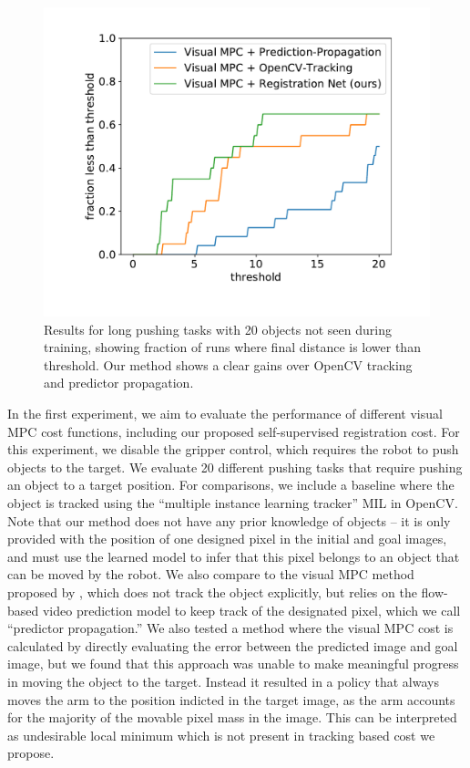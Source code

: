 \begin{figure}
	\centering
	\includegraphics[width=0.6\columnwidth]{images_rfr/pushlong_bench_same_range.pdf}
	\caption{\small{Results for long pushing tasks with 20 objects not seen during training, showing fraction of runs where final distance is lower than threshold. Our method shows a clear gains over OpenCV tracking and predictor propagation.}}
	\label{fig:push_bench_long}
\end{figure}

In the first experiment, we aim to evaluate the performance of different visual MPC cost functions, including our proposed self-supervised registration cost. For this experiment, we disable the gripper control, which requires the robot to push objects to the target. We evaluate 20 different pushing tasks that require pushing an object to a target position. For comparisons, we include a baseline where the object is tracked using the ``multiple instance learning tracker'' MIL \cite{babenko2009visual} in OpenCV. Note that our method does not have any prior knowledge of objects -- it is only provided with the position of one designed pixel in the initial and goal images, and must use the learned model to infer that this pixel belongs to an object that can be moved by the robot. We also compare to the visual MPC method proposed by \cite{sna},
which does not track the object explicitly, but relies on the flow-based video prediction model to keep track of the designated pixel, which we call ``predictor propagation.'' We also tested a method where the visual MPC cost is calculated by directly evaluating the error between the predicted image and goal image, but we found that this approach was unable to make meaningful progress in moving the object to the target. Instead it resulted in a policy that always moves the arm to the position indicted in the target image, as the arm accounts for the majority of the movable pixel mass in the image. This can be interpreted as undesirable local minimum which is not present in tracking based cost we propose.

